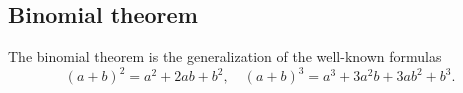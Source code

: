 \subsection{Binomial theorem}
The binomial theorem is the generalization of the well-known formulas
\[
(a+b)^2 = a^2 + 2ab + b^2, \quad (a+b)^3 = a^3 + 3a^2b + 3ab^2 + b^3.
\]
